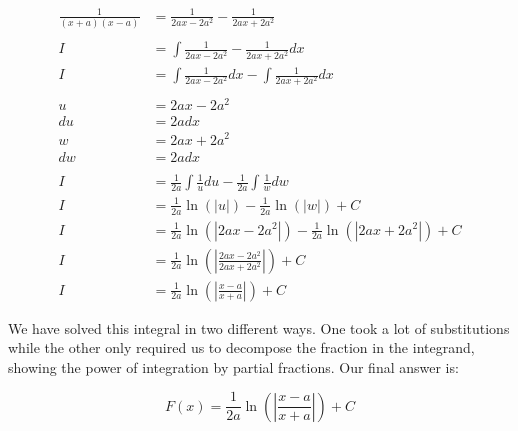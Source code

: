 \documentclass[12pt]{article}
\begin{document}
\begin{align}
    \frac{1}{(x+a)(x-a)} & = \frac{1}{2ax-2a^2} - \frac{1}{2ax+2a^2}                                        \\
    \nonumber                                                                                               \\
    I                    & = \int \frac{1}{2ax-2a^2} - \frac{1}{2ax+2a^2} dx                                \\
    I                    & = \int \frac{1}{2ax-2a^2} dx - \int \frac{1}{2ax+2a^2} dx                        \\
    \nonumber                                                                                               \\
    u                    & = 2ax-2a^2                                                                       \\
    du                   & = 2a dx                                                                          \\
    w                    & = 2ax+2a^2                                                                       \\
    dw                   & = 2a dx                                                                          \\
    \nonumber                                                                                               \\
    I                    & = \frac{1}{2a} \int \frac{1}{u} du - \frac{1}{2a} \int \frac{1}{w} dw            \\
    I                    & = \frac{1}{2a} \ln(|u|) - \frac{1}{2a} \ln(|w|) + C                              \\
    I                    & = \frac{1}{2a} \ln(|2ax-2a^2|) - \frac{1}{2a} \ln(|2ax+2a^2|) + C                \\
    I                    & = \frac{1}{2a} \ln\left(\left|\frac{2ax-2a^2}{2ax+2a^2}\right|\right) + C        \\
    I                    & = \frac{1}{2a} \ln\left(\left|\frac{x-a}{x+a}\right|\right) + C
\end{align}


We have solved this integral in two different ways. One took a lot of substitutions while the other only required us to decompose the fraction in the integrand, showing the power of integration by partial fractions. Our final answer is:

$$
    F(x) = \frac{1}{2a} \ln\left(\left|\frac{x-a}{x+a}\right|\right) + C
$$
\end{document}
